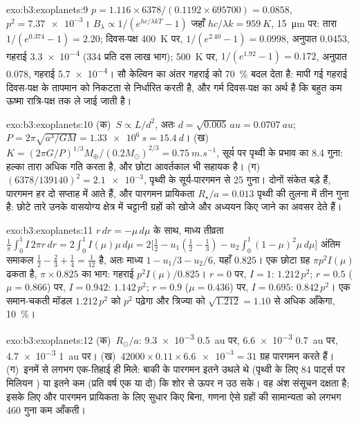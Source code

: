 \begin{solution}{exo:b3:exoplanets:9}
$p = 1.116\times6378/(0.1192\times695700) = 0.0858$, $p^2 = \num{7.37e-3}$।
$B_\lambda \propto 1/(e^{hc/\lambda kT} - 1)$ जहाँ $hc/\lambda k =
\qty{959}{K}$, \qty{15}{\micro m} पर: तारा $1/(e^{0.374} - 1) = 2.20$;
दिवस-पक्ष \qty{400}{K} पर, $1/(e^{2.40} - 1) = 0.0998$, अनुपात \num{0.0453},
गहराई \num{3.3e-4} (334 प्रति दस लाख भाग); \qty{500}{K} पर, $1/(e^{1.92} -
1) = 0.172$, अनुपात \num{0.078}, गहराई \num{5.7e-4}। सौ केल्विन
का अंतर गहराई को \qty{70}{\percent} बदल देता है: मापी गई गहराई दिवस-पक्ष
के तापमान को निकटता से निर्धारित करती है, और गर्म दिवस-पक्ष का अर्थ है कि
बहुत कम ऊष्मा रात्रि-पक्ष तक ले जाई जाती है।
\end{solution}

\begin{solution}{exo:b3:exoplanets:10}
(क)~$S \propto L/d^2$, अतः $d = \sqrt{0.005}\,\unit{au} = \qty{0.0707}{au}$;
$P = 2\pi\sqrt{a^3/GM} = \qty{1.33e6}{s} = \qty{15.4}{d}$।
(ख)~$K = (2\pi G/P)^{1/3}M_\oplus/(0.2M_\odot)^{2/3} = \qty{0.75}{m.s^{-1}}$,
सूर्य पर पृथ्वी के प्रभाव का 8.4 गुना: हल्का तारा अधिक गति करता है, और
छोटा आवर्तकाल भी सहायक है। (ग)~$(6378/139140)^2 = \num{2.1e-3}$, पृथ्वी के
सूर्य-पारगमन से 25 गुना। दोनों संकेत बड़े हैं, पारगमन
हर दो सप्ताह में आते हैं, और पारगमन प्रायिकता $R_\star/a =
\num{0.013}$ पृथ्वी की तुलना में तीन गुना है: छोटे तारे
उनके वासयोग्य क्षेत्र में चट्टानी ग्रहों को खोजे और अध्ययन किए जाने का अवसर देते हैं।
\end{solution}

\begin{solution}{exo:b3:exoplanets:11}
$r\,dr = -\mu\,d\mu$ के साथ, माध्य तीव्रता $\frac1\pi\int_0^1
I\,2\pi r\,dr = 2\int_0^1 I(\mu)\mu\,d\mu = 2\bigl[\tfrac12 - u_1(\tfrac12 -
\tfrac13) - u_2\int_0^1(1 - \mu)^2\mu\,d\mu\bigr]$ अंतिम समाकल
$\tfrac12 - \tfrac23 + \tfrac14 = \tfrac1{12}$ है, अतः माध्य $1 - u_1/3 -
u_2/6$, यहाँ $0.825$। एक छोटा ग्रह $\pi p^2 I(\mu)$ ढकता है, $\pi\times
0.825$ का भाग: गहराई $p^2 I(\mu)/0.825$। $r = 0$ पर, $I = 1$: $1.212\,p^2$;
$r = 0.5$ ($\mu = 0.866$) पर, $I = 0.942$: $1.142\,p^2$; $r = 0.9$ ($\mu =
0.436$) पर, $I = 0.695$: $0.842\,p^2$। एक समान-चकती मॉडल
$1.212\,p^2$ को $p^2$ पढ़ेगा और त्रिज्या को $\sqrt{1.212} = 1.10$ से
अधिक आँकेगा, \qty{10}{\percent}।
\end{solution}

\begin{solution}{exo:b3:exoplanets:12}
(क)~$R_\odot/a$: \num{9.3e-3} \qty{0.5}{au} पर, \num{6.6e-3}
\qty{0.7}{au} पर, \num{4.7e-3} \qty{1}{au} पर। (ख)~$42000\times0.11\times
\num{6.6e-3} = 31$ ग्रह पारगमन करते हैं। (ग)~इनमें से लगभग एक-तिहाई ही
मिले: बाकी के पारगमन इतने उथले थे (पृथ्वी के लिए 84 पार्ट्स पर मिलियन
) या इतने कम (प्रति वर्ष एक या दो) कि शोर से ऊपर न उठ सके। वह
अंश संसूचन दक्षता है; इसके लिए और पारगमन प्रायिकता के लिए सुधार किए बिना,
गणना ऐसे ग्रहों की सामान्यता
को लगभग 460 गुना कम आँकती।
\end{solution}

